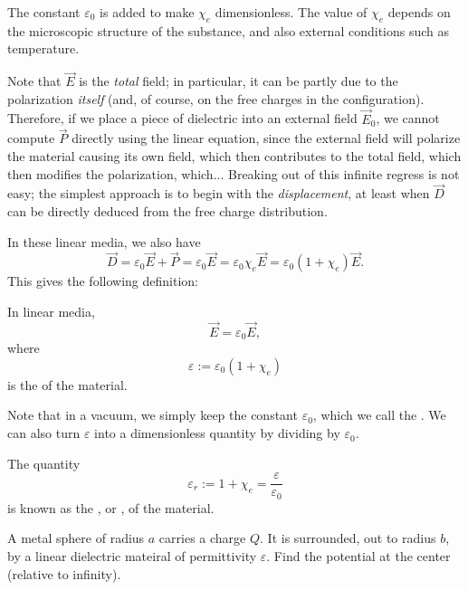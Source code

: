The constant $\varepsilon_0$ is added to make $\chi_e$ dimensionless. The value of $\chi_e$ depends on the microscopic structure of the substance, and also external conditions such as temperature.

Note that $\vec{E}$ is the \textit{total} field; in particular, it can be partly due to the polarization \textit{itself} (and, of course, on the free charges in the configuration). Therefore, if we place a piece of dielectric into an external field $\vec{E}_0$, we cannot compute $\vec{P}$ directly using the linear equation, since the external field will polarize the material causing its own field, which then contributes to the total field, which then modifies the polarization, which... Breaking out of this infinite regress is not easy; the simplest approach is to begin with the \textit{displacement}, at least when $\vec{D}$ can be directly deduced from the free charge distribution.

In these linear media, we also have
\[\vec{D}=\varepsilon_0\vec{E}+\vec{P}=\varepsilon_0\vec{E}=\varepsilon_0\chi_e\vec{E}=\varepsilon_0(1+\chi_e)\vec{E}.\]
This gives the following definition:
\begin{definition}\label{permittivity}
In linear media, 
\[\vec{E}=\varepsilon_0\vec{E},\]
where 
\[\varepsilon:=\varepsilon_0(1+\chi_e)\]
is the  of the material.
\end{definition}

Note that in a vacuum, we simply keep the constant $\varepsilon_0$, which we call the . We can also turn $\varepsilon$ into a dimensionless quantity by dividing by $\varepsilon_0$.

\begin{definition}
The quantity
\[\varepsilon_r:=1+\chi_e=\frac{\varepsilon}{\varepsilon_0}\]
is known as the , or , of the material.
\end{definition}

\begin{example}
A metal sphere of radius $a$ carries a charge $Q$. It is surrounded, out to radius $b$, by a linear dielectric mateiral of permittivity $\varepsilon$. Find the potential at the center (relative to infinity).
\end{example}

